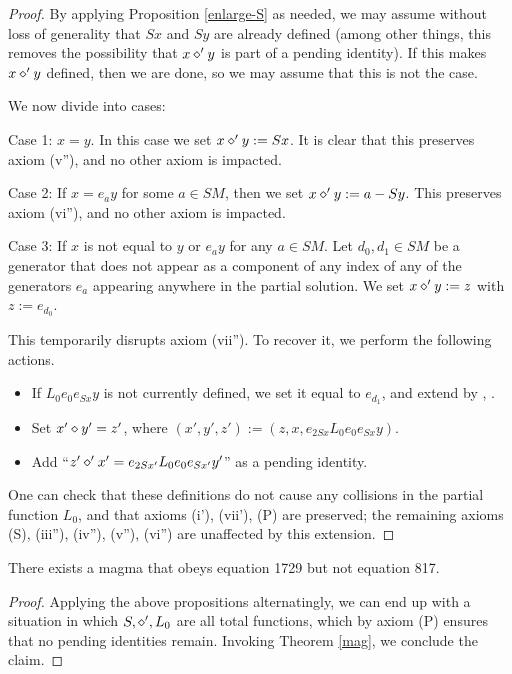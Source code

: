 \begin{proof}  By applying Proposition \ref{enlarge-S} as needed, we may assume without loss of generality that $Sx$ and $Sy$ are already defined (among other things, this removes the possibility that $x \diamond' y$ is part of a pending identity).  If this makes $x \diamond' y$ defined, then we are done, so we may assume that this is not the case.

We now divide into cases:

Case 1: $x=y$.  In this case we set $x \diamond' y := Sx$.  It is clear that this preserves axiom (v''), and no other axiom is impacted.

Case 2: If $x = e_a y$ for some $a \in SM$, then we set $x \diamond' y := a - Sy$.  This preserves axiom (vi''), and no other axiom is impacted.

Case 3: If $x$ is not equal to $y$ or $e_a y$ for any $a \in SM$.  Let $d_0, d_1 \in SM$ be a generator that does not appear as a component of any index of any of the generators $e_a$ appearing anywhere in the partial solution.  We set $x \diamond' y := z$ with $z := e_{d_0}$.

This temporarily disrupts axiom (vii'').  To recover it, we perform the following actions.
\begin{itemize}
  \item If $L_0 e_0 e_{Sx} y$ is not currently defined, we set it equal to $e_{d_1}$, and extend by , .
  \item Set $x' \diamond y' = z'$, where $(x',y',z') := (z, x, e_{2Sx} L_0 e_0 e_{Sx} y)$.
  \item Add ``$z' \diamond' x' = e_{2Sx'} L_0 e_0 e_{Sx'} y'$'' as a pending identity.
\end{itemize}

One can check that these definitions do not cause any collisions in the partial function $L_0$, and that axioms (i'), (vii'), (P) are preserved; the remaining axioms (S), (iii''), (iv''), (v''), (vi'') are unaffected by this extension.
\end{proof}


\begin{theorem}\label{1729_refute_817} There exists a magma that obeys equation 1729 but not equation 817.
\end{theorem}

\begin{proof}
  Applying the above propositions alternatingly, we can end up with a situation in which $S, \diamond', L_0$ are all total functions, which by axiom (P) ensures that no pending identities remain.  Invoking Theorem \ref{mag}, we conclude the claim.
\end{proof}
